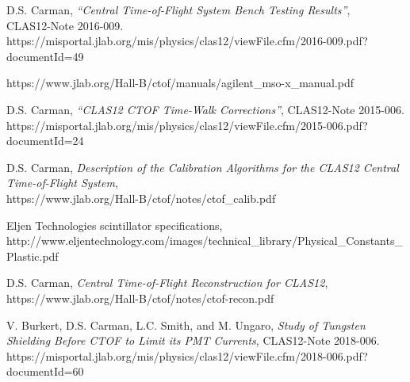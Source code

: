 \documentclass{elsart}
\begin{document}
\begin{thebibliography}{99}
D.S. Carman, {\it ``Central Time-of-Flight System Bench Testing Results''},\\
CLAS12-Note 2016-009.\\
https://misportal.jlab.org/mis/physics/clas12/viewFile.cfm/2016-009.pdf?documentId=49

https://www.jlab.org/Hall-B/ctof/manuals/agilent\_mso-x\_manual.pdf

D.S. Carman, {\it ``CLAS12 CTOF Time-Walk Corrections''}, CLAS12-Note 2015-006.\\
https://misportal.jlab.org/mis/physics/clas12/viewFile.cfm/2015-006.pdf?documentId=24

D.S. Carman, {\it Description of the Calibration Algorithms for the CLAS12 Central Time-of-Flight System},\\
https://www.jlab.org/Hall-B/ctof/notes/ctof\_calib.pdf

Eljen Technologies scintillator specifications,\\
http://www.eljentechnology.com/images/technical\_library/Physical\_Constants\_Plastic.pdf

D.S. Carman, {\it Central Time-of-Flight Reconstruction for CLAS12},\\
https://www.jlab.org/Hall-B/ctof/notes/ctof-recon.pdf

V. Burkert, D.S. Carman, L.C. Smith, and M. Ungaro, {\it Study of Tungsten Shielding Before CTOF to Limit
its PMT Currents}, CLAS12-Note 2018-006.\\
https://misportal.jlab.org/mis/physics/clas12/viewFile.cfm/2018-006.pdf?documentId=60
  





\end{thebibliography}
\end{document}
